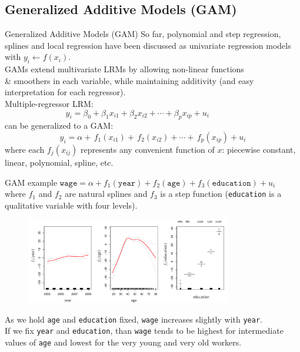 \documentclass{beamer}
\begin{document}
\subsection{Generalized Additive Models (GAM)}
\begin{frame}{Generalized Additive Models (GAM)}
So far, polynomial and step regression, splines and local regression have been discussed as univariate regression models with $y_i \leftarrow f(x_i)$.\\
\medskip GAMs extend multivariate LRMs by allowing non-linear functions\\ \& smoothers in each variable, while maintaining additivity (and easy interpretation for each regressor).\\ \medskip
Multiple-regressor LRM:
$$ y_i = \beta_0 + \beta_1 x_{i1} + \beta_2 x_{i2} + \cdots + \beta_p x_{ip} + u_i~~~~~~~~~~~~~~~~~$$
can be generalized to a GAM:
$$ y_i = \alpha + \, f_1(x_{i1}) + \, f_2(x_{i2}) + \cdots + \, f_p(x_{ip}) + u_i$$ 
where each $f_j(x_{ij})$ represents any convenient function of $x$: piecewise constant, linear, polynomial, spline, etc.
\end{frame}
\begin{frame}{GAM example}
$\texttt{wage} = \alpha + f_1(\texttt{year}) + f_2(\texttt{age}) + f_3(\texttt{education}) + u_i$\\
\bigskip
where $f_1$ and $f_2$ are natural splines and $f_3$ is a step function (\texttt{education} is a qualitative variable with four levels).
\vspace{-0.2cm}
\begin{figure}
  \centering
  \includegraphics[trim=0cm 0cm 0cm 0cm, clip=true, width=0.8\textwidth]{IMG/ISLR711.pdf}
\end{figure}
\centering
\vspace{-0.3cm}
\tiny
As we hold \texttt{age} and \texttt{education} fixed, \texttt{wage} increases slightly with \texttt{year}.\\
If we fix \texttt{year} and \texttt{education}, than \texttt{wage} tends to be highest for intermediate \\values of  \texttt{age} and lowest for the very young and very old workers.
\end{frame}
\end{document}
